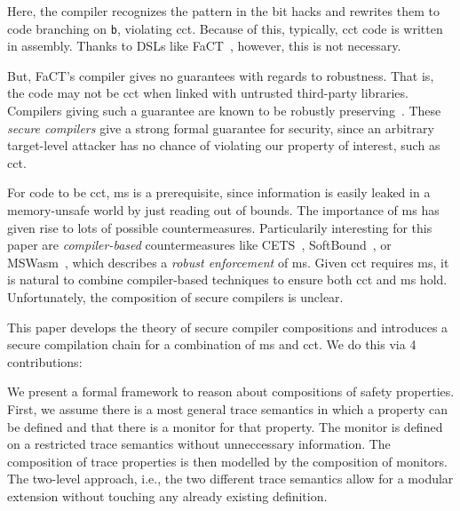 \documentclass[acmsmall,review,screen,dvipsnames]{acmart}
\begin{document}
\noindent
Here, the compiler recognizes the pattern in the bit hacks and rewrites them to code branching on \verb|b|, violating \gls{cct}.
Because of this, typically, \gls{cct} code is written in assembly.
Thanks to DSLs like FaCT~\cite{cauligi2019fact}, however, this is not necessary.

But, FaCT's compiler gives no guarantees with regards to robustness.
That is, the code may not be \gls{cct} when linked with untrusted third-party libraries.
%
Compilers giving such a guarantee are known to be robustly preserving~\cite{abate2019jour}.
These \emph{secure compilers} give a strong formal guarantee for security, since an arbitrary target-level attacker has no chance of violating our property of interest, such as \gls{cct}.

For code to be \gls{cct}, \gls{ms} is a prerequisite, since information is easily leaked in a memory-unsafe world by just reading out of bounds.
The importance of \gls{ms} has given rise to lots of possible countermeasures.
Particularily interesting for this paper are \emph{compiler-based} countermeasures like CETS~\cite{nagarakatte2010cets}, SoftBound~\cite{nagarakatte2009soft}, or MSWasm~\cite{michael2023mswasm}, which describes a \emph{robust enforcement} of \gls{ms}.
Given \gls{cct} requires \gls{ms}, it is natural to combine compiler-based techniques to ensure both \gls{cct} and \gls{ms} hold.
Unfortunately, the composition of secure compilers is unclear.

This paper develops the theory of secure compiler compositions and introduces a secure compilation chain for a combination of \gls{ms} and \gls{cct}.
We do this via 4 contributions:

We present a formal framework to reason about compositions of safety properties.
First, we assume there is a most general trace semantics in which a property can be defined and that there is a monitor for that property.
The monitor is defined on a restricted trace semantics without unneccessary information.
The composition of trace properties is then modelled by the composition of monitors.
The two-level approach, i.e., the two different trace semantics allow for a modular extension without touching any already existing definition.
\end{document}
